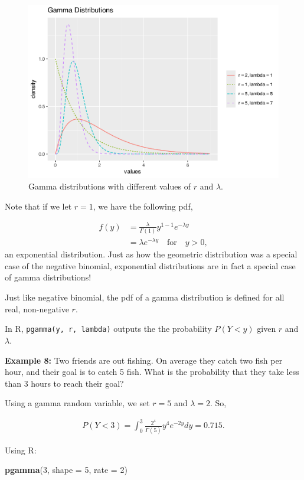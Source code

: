 \documentclass[
]{krantz}
\newenvironment{Shaded}{\begin{snugshade}}{\end{snugshade}}
\newcommand{\DataTypeTok}[1]{\textcolor[rgb]{0.27,0.27,0.27}{#1}}
\newcommand{\DecValTok}[1]{\textcolor[rgb]{0.06,0.06,0.06}{#1}}
\newcommand{\KeywordTok}[1]{\textcolor[rgb]{0.27,0.27,0.27}{\textbf{#1}}}
\newcommand{\NormalTok}[1]{#1}
\begin{document}
\begin{figure}

{\centering \includegraphics[width=0.6\linewidth]{bookdown-BeyondMLR_files/figure-latex/multGamma-1} 

}

\caption{Gamma distributions with different values of \(r\) and \(\lambda\).}\label{fig:multGamma}
\end{figure}

Note that if we let \(r = 1\), we have the following pdf,

\begin{align*}
 f(y) &= \frac{\lambda}{\Gamma(1)} y^{1-1} e^{-\lambda y} \\
      &= \lambda e^{-\lambda y} \quad \textrm{for} \quad y > 0,
\end{align*}
an exponential distribution. Just as how the geometric distribution was a special case of the negative binomial, exponential distributions are in fact a special case of gamma distributions!

Just like negative binomial, the pdf of a gamma distribution is defined for all real, non-negative \(r\).

In R, \texttt{pgamma(y,\ r,\ lambda)} outputs the the probability \(P(Y < y)\) given \(r\) and \(\lambda\).

\textbf{Example 8:} Two friends are out fishing. On average they catch two fish per hour, and their goal is to catch 5 fish. What is the probability that they take less than 3 hours to reach their goal?

Using a gamma random variable, we set \(r = 5\) and \(\lambda = 2\). So,

\begin{align*}
P(Y < 3) = \int_0^3 \frac{2^4}{\Gamma(5)} y^{4} e^{-2y}dy = 0.715.
\end{align*}

Using R:

\begin{Shaded}
\begin{Highlighting}[]
\KeywordTok{pgamma}\NormalTok{(}\DecValTok{3}\NormalTok{, }\DataTypeTok{shape =} \DecValTok{5}\NormalTok{, }\DataTypeTok{rate =} \DecValTok{2}\NormalTok{)}
\end{Highlighting}
\end{Shaded}
\end{document}
